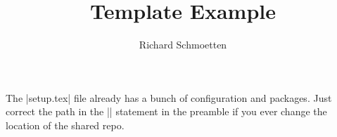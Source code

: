 \documentclass[]{article}
\title{Template Example}
\author{Richard Schmoetten}
\begin{document}
\maketitle

The \lisa|setup.tex| file already has a bunch of configuration and packages. Just correct the path in the \lisa|| statement in the preamble if you ever change the location of the shared repo.
\end{document}
